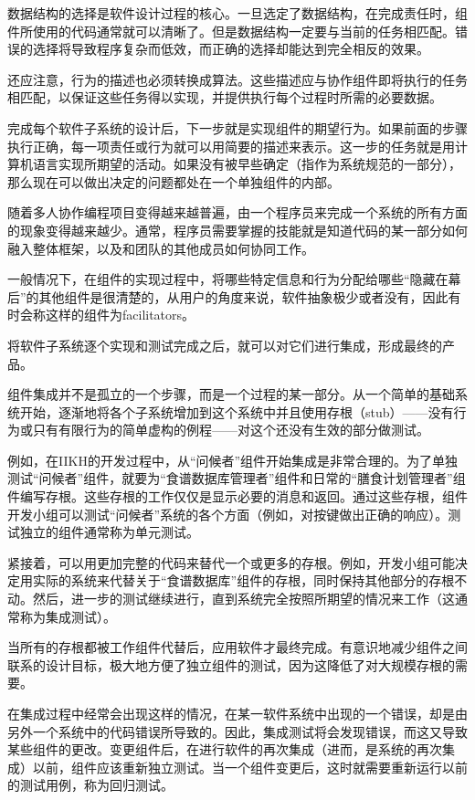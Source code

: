 数据结构的选择是软件设计过程的核心。一旦选定了数据结构，在完成责任时，组件所使用的代码通常就可以清晰了。但是数据结构一定要与当前的任务相匹配。错误的选择将导致程序复杂而低效，而正确的选择却能达到完全相反的效果。

还应注意，行为的描述也必须转换成算法。这些描述应与协作组件即将执行的任务相匹配，以保证这些任务得以实现，并提供执行每个过程时所需的必要数据。


完成每个软件子系统的设计后，下一步就是实现组件的期望行为。如果前面的步骤执行正确，每一项责任或行为就可以用简要的描述来表示。这一步的任务就是用计算机语言实现所期望的活动。如果没有被早些确定（指作为系统规范的一部分），那么现在可以做出决定的问题都处在一个单独组件的内部。

随着多人协作编程项目变得越来越普遍，由一个程序员来完成一个系统的所有方面的现象变得越来越少。通常，程序员需要掌握的技能就是知道代码的某一部分如何融入整体框架，以及和团队的其他成员如何协同工作。

一般情况下，在组件的实现过程中，将哪些特定信息和行为分配给哪些“隐藏在幕后”的其他组件是很清楚的，从用户的角度来说，软件抽象极少或者没有，因此有时会称这样的组件为facilitators。

将软件子系统逐个实现和测试完成之后，就可以对它们进行集成，形成最终的产品。

组件集成并不是孤立的一个步骤，而是一个过程的某一部分。从一个简单的基础系统开始，逐渐地将各个子系统增加到这个系统中并且使用存根（stub）——没有行为或只有有限行为的简单虚构的例程——对这个还没有生效的部分做测试。

例如，在IIKH的开发过程中，从“问候者”组件开始集成是非常合理的。为了单独测试“问候者”组件，就要为“食谱数据库管理者”组件和日常的“膳食计划管理者”组件编写存根。这些存根的工作仅仅是显示必要的消息和返回。通过这些存根，组件开发小组可以测试“问候者”系统的各个方面（例如，对按键做出正确的响应）。测试独立的组件通常称为单元测试。

紧接着，可以用更加完整的代码来替代一个或更多的存根。例如，开发小组可能决定用实际的系统来代替关于“食谱数据库”组件的存根，同时保持其他部分的存根不动。然后，进一步的测试继续进行，直到系统完全按照所期望的情况来工作（这通常称为集成测试）。
	

当所有的存根都被工作组件代替后，应用软件才最终完成。有意识地减少组件之间联系的设计目标，极大地方便了独立组件的测试，因为这降低了对大规模存根的需要。

在集成过程中经常会出现这样的情况，在某一软件系统中出现的一个错误，却是由另外一个系统中的代码错误所导致的。因此，集成测试将会发现错误，而这又导致某些组件的更改。变更组件后，在进行软件的再次集成（进而，是系统的再次集成）以前，组件应该重新独立测试。当一个组件变更后，这时就需要重新运行以前的测试用例，称为回归测试。


